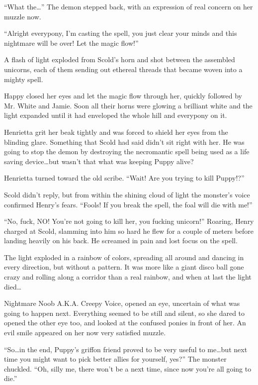 ``What the\dots'' The demon stepped back, with an expression of real concern on her muzzle now.

``Alright everypony, I'm casting the spell, you just clear your minds and this nightmare will be over! Let the magic flow!''

A flash of light exploded from Scold's horn and shot between the assembled unicorns, each of them sending out ethereal threads that became woven into a mighty spell.

Happy closed her eyes and let the magic flow through her, quickly followed by Mr. White and Jamie. Soon all their horns were glowing a brilliant white and the light expanded until it had enveloped the whole hill and everypony on it.

Henrietta grit her beak tightly and was forced to shield her eyes from the blinding glare. Something that Scold had said didn't sit right with her. He was going to stop the demon by destroying the necromantic spell being used as a life saving device\dots but wasn't that what was keeping Puppy alive?

Henrietta turned toward the old scribe. ``Wait! Are you trying to kill Puppy!?''

Scold didn't reply, but from within the shining cloud of light the monster's voice confirmed Henry's fears. ``Fools! If you break the spell, the foal will die with me!''

``No, fuck, NO! You're not going to kill her, you fucking unicorn!'' Roaring, Henry charged at Scold, slamming into him so hard he flew for a couple of meters before landing heavily on his back. He screamed in pain and lost focus on the spell.

The light exploded in a rainbow of colors, spreading all around and dancing in every direction, but without a pattern. It was more like a giant disco ball gone crazy and rolling along a corridor than a real rainbow, and when at last the light died\dots

Nightmare Noob A.K.A. Creepy Voice, opened an eye, uncertain of what was going to happen next. Everything seemed to be still and silent, so she dared to opened the other eye too, and looked at the confused ponies in front of her. An evil smile appeared on her now very satisfied muzzle.

``So\dots in the end, Puppy's griffon friend proved to be very useful to me\dots but next time you might want to pick better allies for yourself, yes?'' The monster chuckled. ``Oh, silly me, there won't be a next time, since now you're all going to die.''

